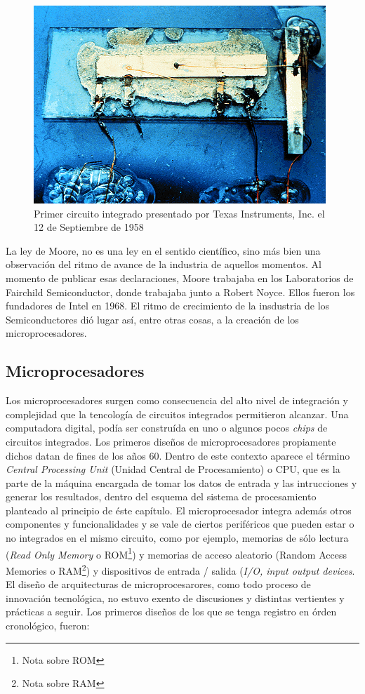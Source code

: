 \begin{figure}
  \centering
  \includegraphics[scale=0.5]{./figures/C02-primer_circuito_integrado}
  \captionsetup{justification=centering}
  \caption{Primer circuito integrado presentado por Texas Instruments, Inc. el 12 de Septiembre de 1958}
  \label{fig:C02-primer_circuito_integrado}
\end{figure}

La ley de Moore, no es una ley en el sentido científico, sino más bien una observación del ritmo de avance de la industria de aquellos momentos. Al momento de publicar esas declaraciones, Moore trabajaba en los Laboratorios de Fairchild Semiconductor, donde trabajaba junto a Robert Noyce. Ellos fueron los fundadores de Intel en 1968. El ritmo de crecimiento de la insdustria de los Semiconductores dió lugar así, entre otras cosas, a la creación de los microprocesadores.

\subsection{Microprocesadores}

Los microprocesadores surgen como consecuencia del alto nivel de integración y complejidad que la tencología de circuitos integrados permitieron alcanzar. Una computadora digital, podía ser construída en uno o algunos pocos \emph{chips} de circuitos integrados. Los primeros diseños de microprocesadores propiamente dichos datan de fines de los años 60. Dentro de este contexto aparece el término \emph{Central Processing Unit} (Unidad Central de Procesamiento) o CPU, que es la parte de la máquina encargada de tomar los datos de entrada y las intrucciones y generar los resultados, dentro del esquema del sistema de procesamiento planteado al principio de éste capítulo. El microprocesador integra además otros componentes y funcionalidades y se vale de ciertos periféricos que pueden estar o no integrados en el mismo circuito, como por ejemplo, memorias de sólo lectura (\emph{Read Only Memory} o ROM\footnote{Nota sobre ROM}) y memorias de acceso aleatorio (Random Access Memories o RAM\footnote{Nota sobre RAM}) y dispositivos de entrada / salida (\emph{I/O, input output devices}. El diseño de arquitecturas de microprocesarores, como todo proceso de innovación tecnológica, no estuvo exento de discusiones y distintas vertientes y prácticas a seguir. Los primeros diseños de los que se tenga registro en órden cronológico, fueron:

